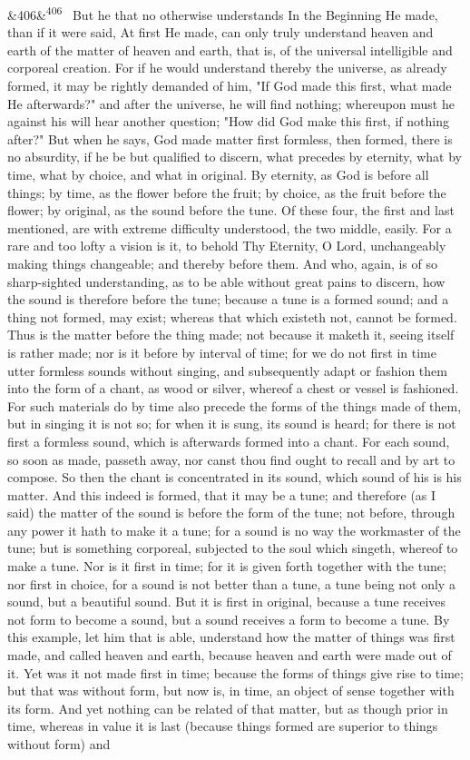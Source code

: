 \documentclass[12pt]{article}
\newcommand{\para}[1][]{\par\noindent\ifx&#1&\else\textsuperscript{\footnotesize #1}~\fi}
\begin{document}
\para[406] But he that no otherwise understands In the Beginning He made, than if it were said, At first He made, can only truly understand heaven and earth of the matter of heaven and earth, that is, of the universal intelligible and corporeal creation. For if he would understand thereby the universe, as already formed, it may be rightly demanded of him, "If God made this first, what made He afterwards?" and after the universe, he will find nothing; whereupon must he against his will hear another question; "How did God make this first, if nothing after?" But when he says, God made matter first formless, then formed, there is no absurdity, if he be but qualified to discern, what precedes by eternity, what by time, what by choice, and what in original. By eternity, as God is before all things; by time, as the flower before the fruit; by choice, as the fruit before the flower; by original, as the sound before the tune. Of these four, the first and last mentioned, are with extreme difficulty understood, the two middle, easily. For a rare and too lofty a vision is it, to behold Thy Eternity, O Lord, unchangeably making things changeable; and thereby before them. And who, again, is of so sharp-sighted understanding, as to be able without great pains to discern, how the sound is therefore before the tune; because a tune is a formed sound; and a thing not formed, may exist; whereas that which existeth not, cannot be formed. Thus is the matter before the thing made; not because it maketh it, seeing itself is rather made; nor is it before by interval of time; for we do not first in time utter formless sounds without singing, and subsequently adapt or fashion them into the form of a chant, as wood or silver, whereof a chest or vessel is fashioned. For such materials do by time also precede the forms of the things made of them, but in singing it is not so; for when it is sung, its sound is heard; for there is not first a formless sound, which is afterwards formed into a chant. For each sound, so soon as made, passeth away, nor canst thou find ought to recall and by art to compose. So then the chant is concentrated in its sound, which sound of his is his matter. And this indeed is formed, that it may be a tune; and therefore (as I said) the matter of the sound is before the form of the tune; not before, through any power it hath to make it a tune; for a sound is no way the workmaster of the tune; but is something corporeal, subjected to the soul which singeth, whereof to make a tune. Nor is it first in time; for it is given forth together with the tune; nor first in choice, for a sound is not better than a tune, a tune being not only a sound, but a beautiful sound. But it is first in original, because a tune receives not form to become a sound, but a sound receives a form to become a tune. By this example, let him that is able, understand how the matter of things was first made, and called heaven and earth, because heaven and earth were made out of it. Yet was it not made first in time; because the forms of things give rise to time; but that was without form, but now is, in time, an object of sense together with its form. And yet nothing can be related of that matter, but as though prior in time, whereas in value it is last (because things formed are superior to things without form) and 
\end{document}
